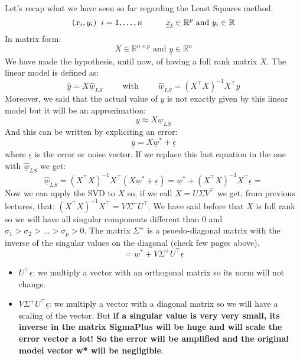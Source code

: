 Let's recap what we have seen so far regarding the Least Squares method.
\[
    (x_i, y_i) \hspace{0.2cm} i = 1, \dots, n  \hspace{1cm} \underline{x_i} \in \mathbb{R}^p \text{ and } y_i \in \mathbb{R}
\]
In matrix form:
\[
    X \in \mathbb{R}^{n \times p} \text{ and } \underline{y} \in \mathbb{R}^n    
\]
We have made the hypothesis, until now, of having a full rank matrix $X$. The linear model is defined as:
\[
    \underline{\hat{y}} = X\underline{\hat{w}}_{LS} \hspace{1cm} \text{with} \hspace{1cm} \underline{\hat{w}}_{LS} = (X^\intercal X)^{-1} X^\intercal \underline{y}    
\]
Moreover, we said that the actual value of $y$ is not exactly given by this linear model but it will be an approximation:
\[
    y \approx X \underline{w}_{LS}
\]
And this can be written by expliciting an error:
\[
    \underline{y} = X\underline{w}^* + \underline{\epsilon}    
\]
where $\underline{\epsilon}$ is the error or noise vector. If we replace this last equation in the one with $\underline{\hat{w}}_{LS}$ we get:
\[
    \underline{\hat{w}}_{LS} = (X^\intercal X)^{-1} X^\intercal (X\underline{w}^* + \underline{\epsilon}) = \underline{w}^* + (X^\intercal X)^{-1} X^\intercal \underline{\epsilon} =      
\]
Now we can apply the SVD to $X$ so, if we call $X = U\Sigma V^\intercal$ we get, from previous lectures, that: $(X^\intercal X)^{-1} X^\intercal = V\Sigma^+ U^\intercal$. We have said before that $X$ is full rank so we will have all singular components different than 0 and $\sigma_1 > \sigma_2 > \dots > \sigma_p > 0$. The matrix $\Sigma^+$ is a psuedo-diagonal matrix with the inverse of the singular values on the diagonal (check few pages above). 
\[
    =  \underline{w}^* + V\Sigma^+ U^\intercal \underline{\epsilon}    
\]
\begin{itemize}
    \item $U^\intercal \underline{\epsilon}$: we multiply a vector with an orthogonal matrix so its norm will not change.
    \item $V\Sigma^+ U^\intercal \underline{\epsilon}$: we multiply a vector with a diagonal matrix so we will have a scaling of the vector. But \textbf{if a singular value is very very small, its inverse in the matrix SigmaPlus will be huge and will scale the error vector a lot! So the error will be amplified and the original model vector w* will be negligible}.
\end{itemize}

